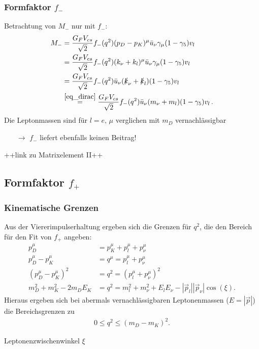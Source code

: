 \documentclass[hyperref={pdfpagelabels=false}]{beamer}
\begin{document}
\begin{frame}
 \frametitle{Formfaktor $f_-$}
 Betrachtung von $M_-$ nur mit $f_-$:
 \begin{align}
  M_- &= \frac{G_F V_{cs}}{\sqrt{2}} f_-(q^2)(p_D-p_K)^\mu\bar u_\nu \gamma_\mu(1-\gamma_5)v_l\nonumber\\
 &= \frac{G_F V_{cs}}{\sqrt{2}} f_-(q^2)(k_\nu+k_l)^\mu \bar u_\nu \gamma_\mu(1-\gamma_5)v_l\,\nonumber\\
  &=\frac{G_F V_{cs}}{\sqrt{2}} f_-(q^2)\bar u_\nu (\slashed{k}_\nu + \slashed{k}_l) (1-\gamma_5)v_l\nonumber\\
 &\stackrel{\eqref{eq_dirac}}{=}\frac{G_F V_{cs}}{\sqrt{2}} f_-(q^2)\bar u_\nu (m_\nu + m_l) (1-\gamma_5)v_l\,.\nonumber 
 \end{align}
Die Leptonmassen sind für $l=e,\,\mu$ verglichen mit $m_D$ vernachlässigbar
\begin{itemize}
 \item [$\rightarrow$] $f_-$ liefert ebenfalls keinen Beitrag!
\end{itemize}
++link zu Matrixelement II++

\end{frame}


\subsection{Formfaktor $f_+$}
\begin{frame}
 \frametitle{Kinematische Grenzen}
 Aus der Viererimpulserhaltung ergeben sich die Grenzen für $q^2$, die den Bereich für den Fit von $f_+$ angeben:
 \begin{align*}
 p_D^\mu &= p_K^\mu + p_l^\mu + p_\nu^\mu \nonumber\\
 p_D^\mu - p_K^\mu &= q^\mu = p_l^\mu + p_\nu^\mu \nonumber\\
 \left(p_D^\mu-p_K^\mu\right)^2 &= q^2 =  (p_l^\mu + p_\nu^\mu )^2\nonumber\\
 m_D^2 + m_K^2 - 2m_DE_K &= q^2 = m_l^2 + m_\nu^2 + E_lE_\nu - |\vec p_l||\vec p_\nu|\cos(\xi).
\end{align*}
Hieraus ergeben sich bei abermals vernachlässigbaren Leptonenmassen ($E = |\vec p|$) die Bereichsgrenzen zu
\begin{align*}
 0 \leq q^2 \leq (m_D-m_K)^2.
\end{align*}

\vspace{0.7cm}
Leptonenzwischenwinkel $\xi$

\end{frame}
\end{document}
